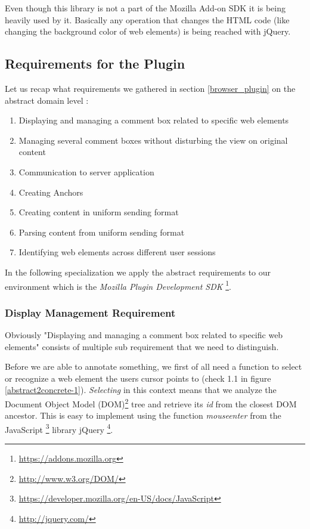 Even though this library is not a part of the Mozilla Add-on SDK it is being heavily used by it. Basically any operation that changes the HTML code (like changing the background color of web elements) is being reached with jQuery.

\subsection{Requirements for the Plugin}\label{firefox_plugin_requirements}
Let us recap what requirements we gathered in section \ref{browser_plugin} on the abstract domain level \cite{van2009requirements}:

\begin{enumerate}
\item Displaying and managing a comment box related to specific web elements
\item Managing several comment boxes without disturbing the view on original content
\item Communication to server application
\item Creating Anchors
\item Creating content in uniform sending format
\item Parsing content from uniform sending format
\item Identifying web elements across different user sessions
\end{enumerate}

In the following specialization we apply the abstract requirements to our environment which is the \emph{Mozilla Plugin Development SDK} \footnote{\url{https://addons.mozilla.org}}. 

\subsubsection{Display Management Requirement}
Obviously "Displaying and managing a comment box related to specific web elements" consists of multiple sub requirement that we need to distinguish. 

Before we are able to annotate something, we first of all need a function to select or recognize a web element the users cursor points to (check 1.1 in figure \ref{abstract2concrete-1}). \emph{Selecting} in this context means that we analyze the Document Object Model (DOM)\footnote{\url{http://www.w3.org/DOM/}} tree and retrieve its \emph{id} from the closest DOM ancestor. This is easy to implement using the function \emph{mouseenter} from the JavaScript \footnote{\url{https://developer.mozilla.org/en-US/docs/JavaScript}} library jQuery \footnote{\url{http://jquery.com/}}. 

